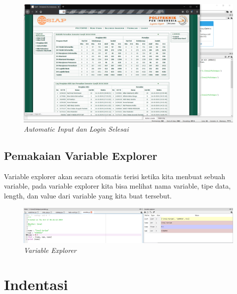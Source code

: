 \begin{figure}[H]
    \centering
    \includegraphics[scale=0.2]{figures/loginselesai}
    \caption{\textit{Automatic Input dan Login Selesai}}
    \label{Automatic4}
\end{figure}

\subsection{Pemakaian Variable Explorer}
Variable explorer akan secara otomatis terisi ketika kita menbuat sebuah variable, pada variable explorer kita bisa melihat nama variable, tipe data, length, dan value dari variable yang kita buat tersebut.
\begin{figure}[H]
    \centering
    \includegraphics[scale=0.3]{figures/variable}
    \caption{\textit{Variable Explorer}}
    \label{Variable Explorer}
\end{figure}

\section{Indentasi}
